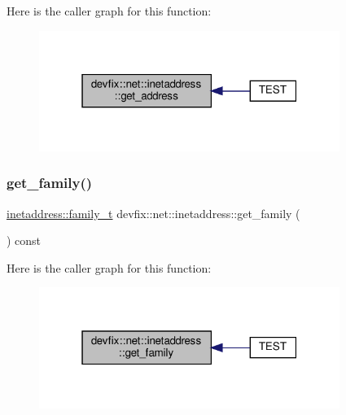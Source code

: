 Here is the caller graph for this function\+:\nopagebreak
\begin{figure}[H]
\begin{center}
\leavevmode
\includegraphics[width=277pt]{structdevfix_1_1net_1_1inetaddress_a8c606f2398a2d3c9436c4932d6c590b2_icgraph}
\end{center}
\end{figure}
\mbox{\label{structdevfix_1_1net_1_1inetaddress_a254e4950de6c6443a39196c6c7f58db4}} 
\subsubsection{\texorpdfstring{get\+\_\+family()}{get\_family()}}
{\footnotesize\ttfamily \hyperlink{structdevfix_1_1net_1_1inetaddress_a1c470962b4c9c675d475dba2344b50f4}{inetaddress\+::family\+\_\+t} devfix\+::net\+::inetaddress\+::get\+\_\+family (\begin{DoxyParamCaption}{ }\end{DoxyParamCaption}) const}

Here is the caller graph for this function\+:\nopagebreak
\begin{figure}[H]
\begin{center}
\leavevmode
\includegraphics[width=277pt]{structdevfix_1_1net_1_1inetaddress_a254e4950de6c6443a39196c6c7f58db4_icgraph}
\end{center}
\end{figure}
\mbox{\label{structdevfix_1_1net_1_1inetaddress_a4524692fae7a767e38600012c6f8f3cf}} 
